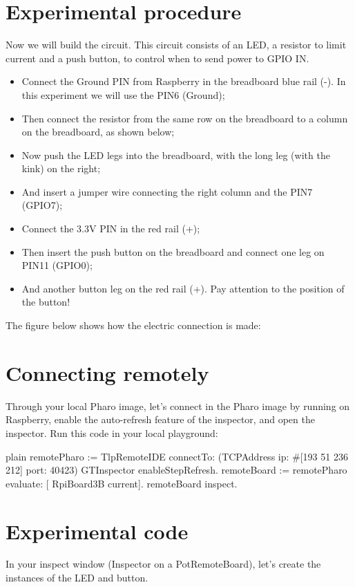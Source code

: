 \documentclass[10pt,twoside,english]{_support/latex/sbabook/sbabook}
\begin{document}
\section{Experimental procedure}
Now we will build the circuit. This circuit consists of an LED, a resistor to limit current and a push button, to control when to send power to GPIO IN.  

\begin{itemize}
\item Connect the Ground PIN from Raspberry in the breadboard blue rail (-). In this experiment we will use the PIN6 (Ground);
\item Then connect the resistor from the same row on the breadboard to a column on the breadboard, as shown below;
\item Now push the LED legs into the breadboard, with the long leg (with the kink) on the right;
\item And insert a jumper wire connecting the right column and the PIN7 (GPIO7);
\item Connect the 3.3V PIN in the red rail (+);
\item Then insert the push button on the breadboard and connect one leg on PIN11 (GPIO0);
\item And another button leg on the red rail (+). Pay attention to the position of the button!
\end{itemize}

The figure below shows how the electric connection is made:
\section{Connecting remotely}
Through your local Pharo image, let’s connect in the Pharo image by running on Raspberry, enable the auto-refresh feature of the inspector, and open the inspector.
Run this code in your local playground:

\begin{displaycode}{plain}
remotePharo := TlpRemoteIDE connectTo: (TCPAddress ip: #[193 51 236 212] port: 40423)
GTInspector enableStepRefresh.
remoteBoard := remotePharo evaluate: [ RpiBoard3B current].
remoteBoard inspect.
\end{displaycode}
\section{Experimental code}
In your inspect window (Inspector on a PotRemoteBoard), let’s create the instances of the LED and button.
\end{document}
